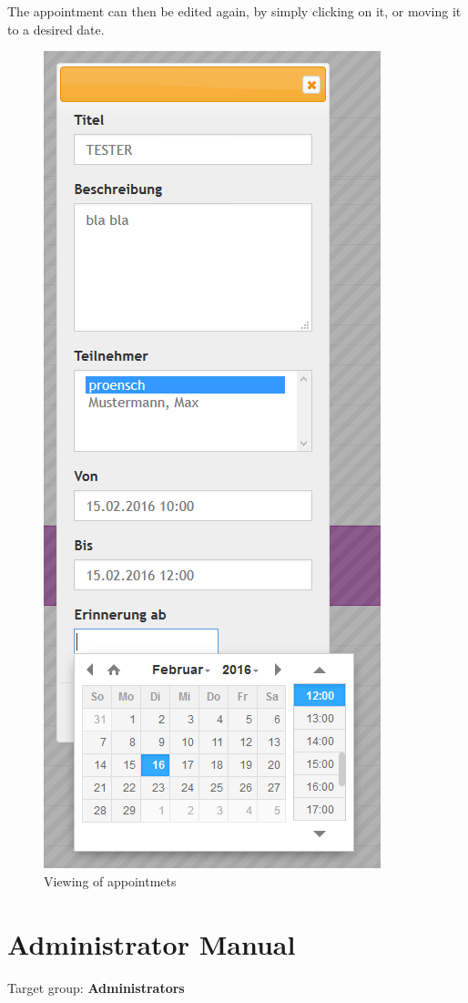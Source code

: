 \documentclass[a4paper,10pt,english]{sphinxmanual}
\begin{document}
The appointment can then be edited again, by simply clicking on it, or moving it to a desired date.
\begin{figure}[htbp]
\centering
\capstart

\includegraphics{datec_timeline_03_createdate1.png}
\caption{Viewing of appointmets}\end{figure}


\chapter{Administrator Manual}
\label{AdministratorManual/Index::doc}\label{AdministratorManual/Index:admin-manual}\label{AdministratorManual/Index:administrator-manual}
Target group: \textbf{Administrators}
\end{document}
